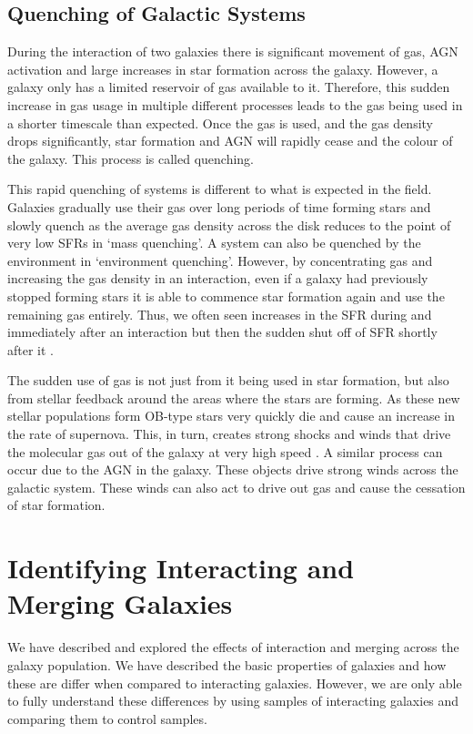 \subsection{Quenching of Galactic Systems}
\noindent During the interaction of two galaxies there is significant movement of gas, AGN activation and large increases in star formation across the galaxy. However, a galaxy only has a limited reservoir of gas available to it. Therefore, this sudden increase in gas usage in multiple different processes leads to the gas being used in a shorter timescale than expected. Once the gas is used, and the gas density drops significantly, star formation and AGN will rapidly cease and the colour of the galaxy. This process is called quenching.

This rapid quenching of systems is different to what is expected in the field. Galaxies gradually use their gas over long periods of time forming stars and slowly quench as the average gas density across the disk reduces to the point of very low SFRs \citep{2010ApJ...721..193P} in `mass quenching'. A system can also be quenched by the environment in `environment quenching'. However, by concentrating gas and increasing the gas density in an interaction, even if a galaxy had previously stopped forming stars it is able to commence star formation again and use the remaining gas entirely. Thus, we often seen increases in the SFR during and immediately after an interaction but then the sudden shut off of SFR shortly after it \citep{2022MNRAS.517L..92E}. 

The sudden use of gas is not just from it being used in star formation, but also from stellar feedback around the areas where the stars are forming. As these new stellar populations form OB-type stars very quickly die and cause an increase in the rate of supernova. This, in turn, creates strong shocks and winds that drive the molecular gas out of the galaxy at very high speed \citep{2013Natur.499..450B, 2018ApJ...864L...1G}. A similar process can occur due to the AGN in the galaxy. These objects drive strong winds across the galactic system. These winds can also act to drive out gas \citep{2014A&A...562A..21C, 2016Natur.533..504C, 2018MNRAS.480.3993B} and cause the cessation of star formation.

\section{Identifying Interacting and Merging Galaxies}
\noindent We have described and explored the effects of interaction and merging across the galaxy population. We have described the basic properties of galaxies and how these are differ when compared to interacting galaxies. However, we are only able to fully understand these differences by using samples of interacting galaxies and comparing them to control samples.

